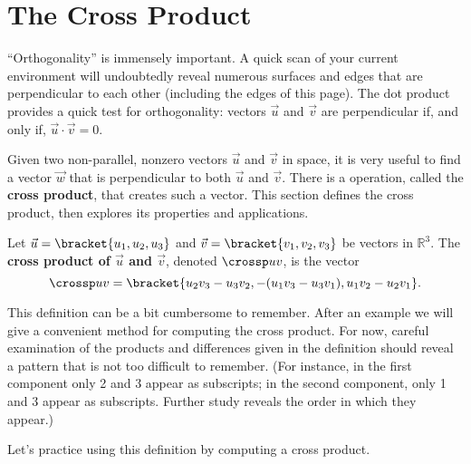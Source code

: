 \section{The Cross Product}\label{sec:cross_product}

``Orthogonality'' is immensely important. A quick scan of your current environment will undoubtedly reveal numerous surfaces and edges that are perpendicular to each other (including the edges of this page). The dot product provides a quick test for orthogonality:  vectors $\vec u$ and $\vec v$ are perpendicular if, and only if, $\vec u\cdot\vec v=0$. 

Given two non-parallel, nonzero vectors $\vec u$ and $\vec v$ in space, it is very useful to find a vector $\vec w$ that is perpendicular to both $\vec u$ and $\vec v$. There is a operation, called the \textbf{cross product}, that creates such a vector. This section defines the cross product, then explores its properties and applications.

\begin{definition}\label{def:cross_product}
Let $\vec u =\bracket{u_1,u_2,u_3}$ and $\vec v = \bracket{v_1,v_2,v_3}$ be vectors in $\mathbb{R}^3$. The \textbf{cross product of $\vec u$ and $\vec v$}, denoted $\crossp uv$, is the vector
\[\crossp uv = \bracket{u_2v_3-u_3v_2,-(u_1v_3-u_3v_1),u_1v_2-u_2v_1}.\]
\end{definition}

This definition can be a bit cumbersome to remember. After an example we will give a convenient method for computing the cross product. For now, careful examination of the products and differences given in the definition should reveal a pattern that is not too difficult to remember. (For instance, in the first component only 2 and 3 appear as subscripts; in the second component, only 1 and 3 appear as subscripts. Further study reveals the order in which they appear.)


Let's practice using this definition by computing a cross product.

